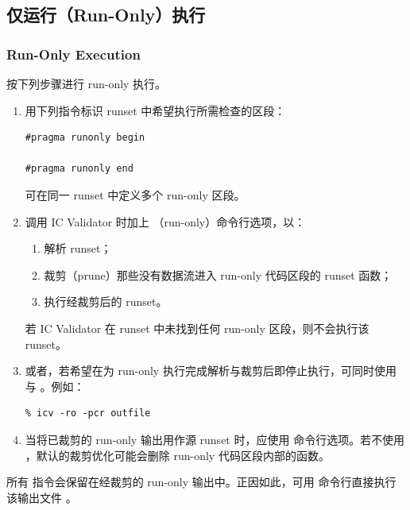 \subsection{仅运行（Run-Only）执行}
\subsubsection*{Run-Only Execution}

按下列步骤进行 run-only 执行。

\begin{enumerate}
  \item 用下列指令标识 runset 中希望执行所需检查的区段：
\begin{lstlisting}[style=pxl]
#pragma runonly begin

#pragma runonly end
\end{lstlisting}
  可在同一 runset 中定义多个 run-only 区段。

  \item 调用 IC Validator 时加上 （run-only）命令行选项，以：
  \begin{enumerate}[label=\alph*.]
    \item 解析 runset；
    \item 裁剪（prune）那些没有数据流进入 run-only 代码区段的 runset 函数；
    \item 执行经裁剪后的 runset。
  \end{enumerate}
\begin{noteBox}
若 IC Validator 在 runset 中未找到任何 run-only 区段，则不会执行该 runset。
\end{noteBox}

  \item 或者，若希望在为 run-only 执行完成解析与裁剪后即停止执行，可同时使用  与 。例如：
\begin{lstlisting}
% icv -ro -pcr outfile
\end{lstlisting}

  \item 当将已裁剪的 run-only 输出用作源 runset 时，应使用  命令行选项。若不使用 ，默认的裁剪优化可能会删除 run-only 代码区段内部的函数。
\end{enumerate}

\begin{noteBox}
所有  指令会保留在经裁剪的 run-only 输出中。正因如此，可用  命令行直接执行该输出文件 。
\end{noteBox}

